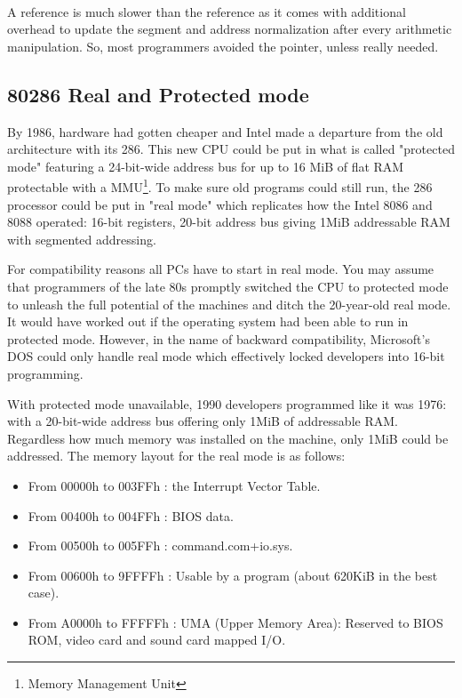 \documentclass[book.tex]{subfiles}
\begin{document}
\\

\par
A  reference is much slower than the  reference as it comes with additional overhead to update the segment and address normalization after every arithmetic manipulation. So, most programmers avoided the  pointer, unless really needed.\\

\subsection{80286 Real and Protected mode}
By 1986, hardware had gotten cheaper and Intel made a departure from the old architecture
with its 286. This new CPU could be put in what is called "protected mode" featuring
a 24-bit-wide address bus for up to 16 MiB of flat RAM protectable with a MMU\footnote{Memory Management Unit}. To make sure old programs could still run, the 286 processor could be put in "real mode" which replicates how the Intel 8086 and 8088 operated: 16-bit registers, 20-bit address bus giving 1MiB addressable RAM with segmented addressing.\\

\par
For compatibility reasons all PCs have to start in real mode. You may assume that programmers
of the late 80s promptly switched the CPU to protected mode to unleash the full
potential of the machines and ditch the 20-year-old real mode. It would have worked out if the operating system had been able to run in protected mode.
However, in the name of backward compatibility, Microsoft's DOS could only handle real
mode which effectively locked developers into 16-bit programming.\\


\par
  With protected mode unavailable, 1990 developers programmed like it was 1976: with a 20-bit-wide address bus offering only 1MiB of addressable RAM. Regardless how much memory was installed on the machine, only 1MiB could be addressed. The memory layout for the real mode is as follows:
\begin{itemize}
\item From 00000h to 003FFh : the Interrupt Vector Table.
\item From 00400h to 004FFh : BIOS data.
\item From 00500h to 005FFh : command.com+io.sys.
\item From 00600h to 9FFFFh : Usable by a program (about 620KiB in the best case). 
\item From A0000h to FFFFFh : UMA (Upper Memory Area): Reserved to BIOS ROM, video card and sound card mapped I/O.
\end{itemize}
\end{document}
